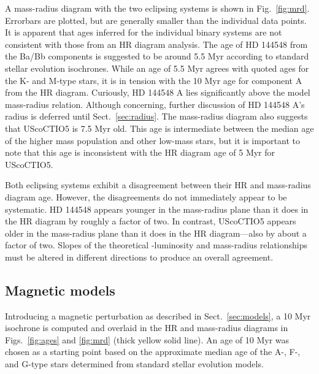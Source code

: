 \documentclass{aa}
\begin{document}
A mass-radius diagram with the two eclipsing systems is shown in Fig.~\ref{fig:mrd}. Errorbars are plotted, but are generally smaller than the individual data points. It is apparent that ages inferred for the individual binary systems are not consistent with those from an HR diagram analysis. The age of HD 144548 from the Ba/Bb components is suggested to be around 5.5 Myr according to standard stellar evolution isochrones. While an age of 5.5 Myr agrees with quoted ages for the K- and M-type stars, it is in tension with the 10 Myr age for component A from the HR diagram. Curiously, HD 144548 A lies significantly above the model mass-radius relation. Although concerning, further discussion of HD 144548 A's radius is deferred until Sect.~\ref{sec:radius}. The mass-radius diagram also suggests that UScoCTIO5 is 7.5 Myr old. This age is intermediate between the median age of the higher mass population and other low-mass stars, but it is important to note that this age is inconsistent with the HR diagram age of 5 Myr for UScoCTIO5. 

Both eclipsing systems exhibit a disagreement between their HR and mass-radius diagram age. However, the disagreements do not immediately appear to be systematic. HD 144548 appears younger in the mass-radius plane than it does in the HR diagram by roughly a factor of two. In contrast, UScoCTIO5 appears older in the mass-radius plane than it does in the HR diagram---also by about a factor of two. Slopes of the theoretical \teff-luminosity and mass-radius relationships must be altered in different directions to produce an overall agreement.

\subsection{Magnetic models}
Introducing a magnetic perturbation as described in Sect.~\ref{sec:models}, a 10 Myr isochrone is computed and overlaid in the HR and mass-radius diagrams in Figs.~\ref{fig:ages} and \ref{fig:mrd} (thick yellow solid line). An age of 10 Myr was chosen as a starting point based on the approximate median age of the A-, F-, and G-type stars determined from standard stellar evolution models. 
\end{document}
